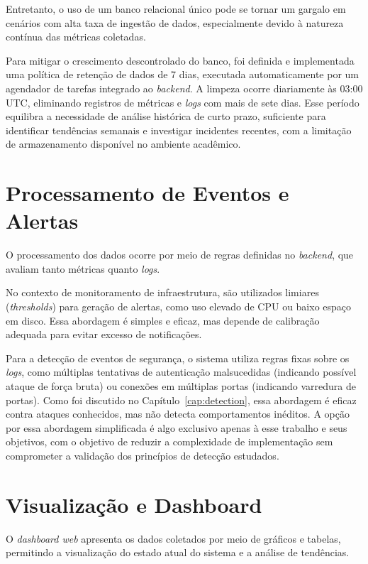 \documentclass[
    12pt
    ,oneside
    ,a4paper
    ,chapter=TITLE
    ,section=TITLE
    ,sumario=abnt-6027-2012]{abntex2}
\begin{document}
Entretanto, o uso de um banco relacional único pode se tornar um gargalo em cenários com alta taxa de ingestão de dados, especialmente devido à natureza contínua das métricas coletadas.

Para mitigar o crescimento descontrolado do banco, foi definida e implementada uma política de retenção de dados de 7 dias, executada automaticamente por um agendador de tarefas integrado ao \textit{backend}. A limpeza ocorre diariamente às 03:00 UTC, eliminando registros de métricas e \textit{logs} com mais de sete dias. Esse período equilibra a necessidade de análise histórica de curto prazo, suficiente para identificar tendências semanais e investigar incidentes recentes, com a limitação de armazenamento disponível no ambiente acadêmico.

\section{Processamento de Eventos e Alertas}

O processamento dos dados ocorre por meio de regras definidas no \textit{backend}, que avaliam tanto métricas quanto \textit{logs}.

No contexto de monitoramento de infraestrutura, são utilizados limiares (\textit{thresholds}) para geração de alertas, como uso elevado de CPU ou baixo espaço em disco. Essa abordagem é simples e eficaz, mas depende de calibração adequada para evitar excesso de notificações.

Para a detecção de eventos de segurança, o sistema utiliza regras fixas sobre os \textit{logs}, como múltiplas tentativas de autenticação malsucedidas (indicando possível ataque de força bruta) ou conexões em múltiplas portas (indicando varredura de portas). Como foi discutido no Capítulo~\ref{cap:detection}, essa abordagem é eficaz contra ataques conhecidos, mas não detecta comportamentos inéditos. A opção por essa abordagem simplificada é algo exclusivo apenas à esse trabalho e seus objetivos, com o objetivo de reduzir a complexidade de implementação sem comprometer a validação dos princípios de detecção estudados.

\section{Visualização e Dashboard}

O \textit{dashboard web} apresenta os dados coletados por meio de gráficos e tabelas, permitindo a visualização do estado atual do sistema e a análise de tendências.
\end{document}
